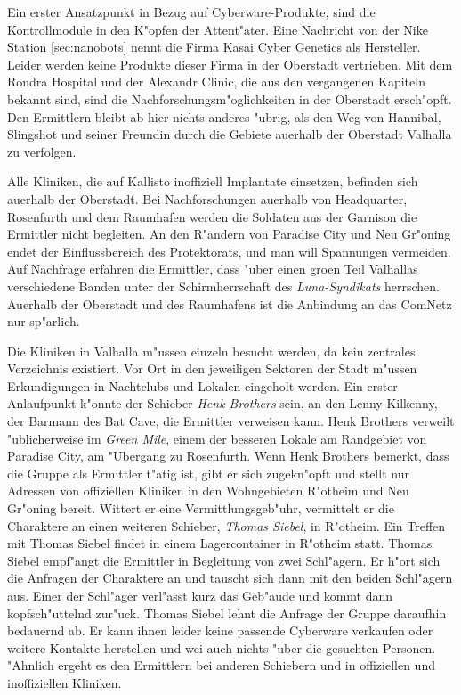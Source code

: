 Ein erster Ansatzpunkt in Bezug auf Cyberware-Produkte, sind die Kontrollmodule in den K"opfen der Attent"ater. Eine Nachricht von der Nike Station \cref{sec:nanobots} nennt die Firma Kasai Cyber Genetics als Hersteller. Leider werden keine Produkte dieser Firma in der Oberstadt vertrieben. Mit dem Rondra Hospital und der Alexandr Clinic, die aus den vergangenen Kapiteln bekannt sind, sind die Nachforschungsm"oglichkeiten in der Oberstadt ersch"opft. Den Ermittlern bleibt ab hier nichts anderes "ubrig, als den Weg von Hannibal, Slingshot und seiner Freundin durch die Gebiete au\3erhalb der Oberstadt Valhalla zu verfolgen.

Alle Kliniken, die auf Kallisto inoffiziell Implantate einsetzen, befinden sich au\3erhalb der Oberstadt. Bei Nachforschungen au\3erhalb von Headquarter, Rosenfurth und dem Raumhafen werden die Soldaten aus der Garnison die Ermittler nicht begleiten. An den R"andern von Paradise City und Neu Gr"oning endet der Einflussbereich des Protektorats, und man will Spannungen vermeiden. Auf Nachfrage erfahren die Ermittler, dass "uber einen gro\3en Teil Valhallas verschiedene Banden unter der Schirmherrschaft des \emph{Luna-Syndikats} herrschen. Au\3erhalb der Oberstadt und des Raumhafens ist die Anbindung an das ComNetz nur sp"arlich.

Die Kliniken in Valhalla m"ussen einzeln besucht werden, da kein zentrales Verzeichnis existiert. Vor Ort in den jeweiligen Sektoren der Stadt m"ussen Erkundigungen in Nachtclubs und Lokalen eingeholt werden. Ein erster Anlaufpunkt k"onnte der Schieber \emph{Henk Brothers} sein, an den Lenny Kilkenny, der Barmann des Bat Cave, die Ermittler verweisen kann. Henk Brothers verweilt "ublicherweise im \emph{Green Mile}, einem der besseren Lokale am Randgebiet von Paradise City, am "Ubergang zu Rosenfurth. Wenn Henk Brothers bemerkt, dass die Gruppe als Ermittler t"atig ist, gibt er sich zugekn"opft und stellt nur Adressen von offiziellen Kliniken in den Wohngebieten R"otheim und Neu Gr"oning bereit. Wittert er eine Vermittlungsgeb"uhr, vermittelt er die Charaktere an einen weiteren Schieber, \emph{Thomas Siebel}, in R"otheim. Ein Treffen mit Thomas Siebel findet in einem Lagercontainer in R"otheim statt. Thomas Siebel empf"angt die Ermittler in Begleitung von zwei Schl"agern. Er h"ort sich die Anfragen der Charaktere an und tauscht sich dann mit den beiden Schl"agern aus. Einer der Schl"ager verl"asst kurz das Geb"aude und kommt dann kopfsch"uttelnd zur"uck. Thomas Siebel lehnt die Anfrage der Gruppe daraufhin bedauernd ab. Er kann ihnen leider keine passende Cyberware verkaufen oder weitere Kontakte herstellen und wei\3 auch nichts "uber die gesuchten Personen. "Ahnlich ergeht es den Ermittlern bei anderen Schiebern und in offiziellen und inoffiziellen Kliniken.

